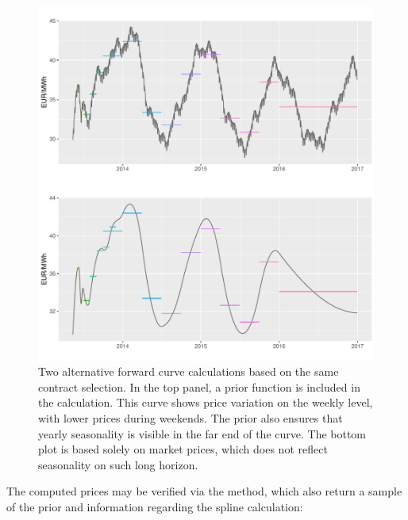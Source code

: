 \begin{figure}[hbtp] %
\centering
\includegraphics [scale = 0.7] {msfc_fut_port.pdf}
\caption{Two alternative forward curve calculations based on the same contract selection. In the top panel, a prior function is included in the calculation. This curve shows price variation on the weekly level, with lower prices during weekends. The prior also ensures that yearly seasonality is visible in the far end of the curve. The bottom plot is based solely on market prices, which does not reflect seasonality on such long horizon.}
\label{fig:msfc_fut_wpri}
\end{figure}



The computed prices may be verified via the  method, which also return a sample of the prior and information regarding the spline calculation:


